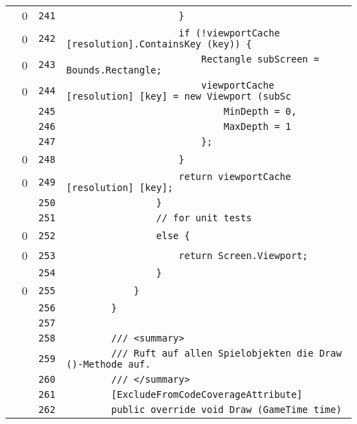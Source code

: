 \documentclass[a4paper,10pt]{article}
\begin{document}
\begin{longtable}[l]{lrrl}
\cellcolor{red} & 0 & \verb~241~ & \verb~                    }~\\
\cellcolor{red} & 0 & \verb~242~ & \verb~                    if (!viewportCache [resolution].ContainsKey (key)) {~\\
\cellcolor{red} & 0 & \verb~243~ & \verb~                        Rectangle subScreen = Bounds.Rectangle;~\\
\cellcolor{red} & 0 & \verb~244~ & \verb~                        viewportCache [resolution] [key] = new Viewport (subSc~\\
\cellcolor{gray} &  & \verb~245~ & \verb~                            MinDepth = 0,~\\
\cellcolor{gray} &  & \verb~246~ & \verb~                            MaxDepth = 1~\\
\cellcolor{gray} &  & \verb~247~ & \verb~                        };~\\
\cellcolor{red} & 0 & \verb~248~ & \verb~                    }~\\
\cellcolor{red} & 0 & \verb~249~ & \verb~                    return viewportCache [resolution] [key];~\\
\cellcolor{gray} &  & \verb~250~ & \verb~                }~\\
\cellcolor{gray} &  & \verb~251~ & \verb~                // for unit tests~\\
\cellcolor{red} & 0 & \verb~252~ & \verb~                else {~\\
\cellcolor{red} & 0 & \verb~253~ & \verb~                    return Screen.Viewport;~\\
\cellcolor{gray} &  & \verb~254~ & \verb~                }~\\
\cellcolor{red} & 0 & \verb~255~ & \verb~            }~\\
\cellcolor{gray} &  & \verb~256~ & \verb~        }~\\
\cellcolor{gray} &  & \verb~257~ & \verb~~\\
\cellcolor{gray} &  & \verb~258~ & \verb~        /// <summary>~\\
\cellcolor{gray} &  & \verb~259~ & \verb~        /// Ruft auf allen Spielobjekten die Draw ()-Methode auf.~\\
\cellcolor{gray} &  & \verb~260~ & \verb~        /// </summary>~\\
\cellcolor{gray} &  & \verb~261~ & \verb~        [ExcludeFromCodeCoverageAttribute]~\\
\cellcolor{gray} &  & \verb~262~ & \verb~        public override void Draw (GameTime time)~\\

\end{longtable}
\end{document}
